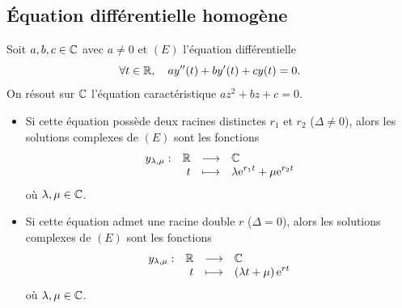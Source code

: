 \documentclass{magnoliaold}
\begin{document}
\subsection{Équation différentielle homogène}

\begin{proposition}[utile=-3]
Soit $a,b,c\in\mathbb{C}$ avec $a\neq 0$ et $(E)$ l'équation différentielle
\[\forall t\in\mathbb{R} ,\quad a y''(t)+by'(t)+cy(t)=0.\]
On résout sur $\mathbb{C}$ l'équation caractéristique $az^2+bz+c=0$.
\begin{itemize}
\item Si cette équation possède deux racines distinctes $r_1$ et $r_2$
  ($\Delta\neq 0$), alors les solutions complexes de $(E)$ sont les fonctions
  \[\begin{array}[t]{lrcl} \displaystyle{y_{\lambda,\mu}} : & \displaystyle{\mathbb{R}} & \longrightarrow & \displaystyle{\mathbb{C}} \\ & \displaystyle{t} & \longmapsto & \displaystyle{\lambda {\rm e}^{r_1 t}+\mu {\rm e}^{r_2 t}} \end{array}\]
  où $\lambda,\mu\in\mathbb{C}$.
\item Si cette équation admet une racine double $r$ ($\Delta=0$), alors les
  solutions complexes de $(E)$ sont les fonctions
  \[\begin{array}[t]{lrcl} \displaystyle{y_{\lambda,\mu}} : & \displaystyle{\mathbb{R}} & \longrightarrow & \displaystyle{\mathbb{C}} \\ & \displaystyle{t} & \longmapsto & \displaystyle{\left(\lambda t+\mu\right){\rm e}^{r t}} \end{array}\]
  où $\lambda,\mu\in\mathbb{C}$.
\end{itemize}
\end{proposition}
\end{document}
